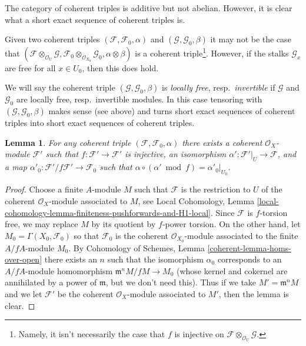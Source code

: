 \documentclass{stacks-project}
\theoremstyle{plain}
\newtheorem{lemma}[subsection]{Lemma}
\theoremstyle{definition}
\theoremstyle{remark}
\numberwithin{equation}{subsection}
\begin{document}
\medskip\noindent
The category of coherent triples is additive but not abelian.
However, it is clear what a short exact sequence of coherent
triples is.

\medskip\noindent
Given two coherent triples $(\mathcal{F}, \mathcal{F}_0, \alpha)$
and $(\mathcal{G}, \mathcal{G}_0, \beta)$ it may not be the case that
$(\mathcal{F} \otimes_{\mathcal{O}_U} \mathcal{G},
\mathcal{F}_0  \otimes_{\mathcal{O}_{X_0}} \mathcal{G}_0,
\alpha \otimes \beta)$ is a coherent triple\footnote{Namely, it
isn't necessarily the case that $f$
is injective on $\mathcal{F} \otimes_{\mathcal{O}_U} \mathcal{G}$.}.
However, if the stalks $\mathcal{G}_x$ are
free for all $x \in U_0$, then this does hold.

\medskip\noindent
We will say the coherent triple $(\mathcal{G}, \mathcal{G}_0, \beta)$
is {\it locally free}, resp.\ {\it invertible}
if $\mathcal{G}$ and $\mathcal{G}_0$
are locally free, resp.\ invertible modules. In this case tensoring
with $(\mathcal{G}, \mathcal{G}_0, \beta)$ makes sense (see above)
and turns short exact sequences of coherent triples into short exact
sequences of coherent triples.

\begin{lemma}
\label{lemma-prepare-chi-triple}
For any coherent triple $(\mathcal{F}, \mathcal{F}_0, \alpha)$
there exists a coherent $\mathcal{O}_X$-module $\mathcal{F}'$
such that $f : \mathcal{F}' \to \mathcal{F}'$ is injective,
an isomorphism $\alpha' : \mathcal{F}'|_U \to \mathcal{F}$, and a map
$\alpha'_0 : \mathcal{F}'/f\mathcal{F}' \to \mathcal{F}_0$
such that $\alpha \circ (\alpha' \bmod f) = \alpha'_0|_{U_0}$.
\end{lemma}

\begin{proof}
Choose a finite $A$-module $M$ such that $\mathcal{F}$ is the restriction
to $U$ of the coherent $\mathcal{O}_X$-module associated to $M$, see
Local Cohomology, Lemma
\ref{local-cohomology-lemma-finiteness-pushforwards-and-H1-local}.
Since $\mathcal{F}$ is $f$-torsion free, we may replace $M$ by
its quotient by $f$-power torsion.
On the other hand, let $M_0 = \Gamma(X_0, \mathcal{F}_0)$
so that $\mathcal{F}_0$ is the coherent $\mathcal{O}_{X_0}$-module
associated to the finite $A/fA$-module $M_0$.
By Cohomology of Schemes, Lemma \ref{coherent-lemma-homs-over-open}
there exists an $n$ such that the
isomorphism $\alpha_0$ corresponds to an $A/fA$-module homomorphism
$\mathfrak m^n M/fM \to M_0$ (whose kernel and cokernel
are annihilated by a power of $\mathfrak m$, but we don't need this).
Thus if we take $M' = \mathfrak m^n M$ and we let
$\mathcal{F}'$ be the coherent $\mathcal{O}_X$-module
associated to $M'$, then the lemma is clear.
\end{proof}
\end{document}
